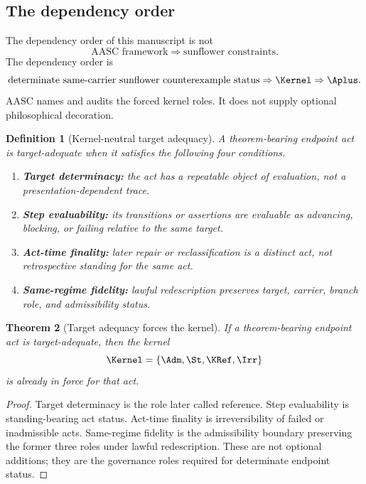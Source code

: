 \documentclass[11pt]{article}
\newtheorem{theorem}{Theorem}[section]
\newtheorem{definition}[theorem]{Definition}
\begin{document}
\subsection{The dependency order}

The dependency order of this manuscript is not
\[
  \text{AASC framework}\Rightarrow \text{sunflower constraints}.
\]
The dependency order is
\[
  \text{determinate same-carrier sunflower counterexample status}
  \Rightarrow \Kernel
  \Rightarrow \Aplus.
\]
AASC names and audits the forced kernel roles.  It does not supply optional philosophical decoration.

\begin{definition}[Kernel-neutral target adequacy]
A theorem-bearing endpoint act is target-adequate when it satisfies the following four conditions.
\begin{enumerate}[label=(A\arabic*)]
\item \textbf{Target determinacy:} the act has a repeatable object of evaluation, not a presentation-dependent trace.
\item \textbf{Step evaluability:} its transitions or assertions are evaluable as advancing, blocking, or failing relative to the same target.
\item \textbf{Act-time finality:} later repair or reclassification is a distinct act, not retrospective standing for the same act.
\item \textbf{Same-regime fidelity:} lawful redescription preserves target, carrier, branch role, and admissibility status.
\end{enumerate}
\end{definition}

\begin{theorem}[Target adequacy forces the kernel]\label{thm:adequacy-kernel}
If a theorem-bearing endpoint act is target-adequate, then the kernel
\[
  \Kernel=\{\Adm,\St,\KRef,\Irr\}
\]
is already in force for that act.
\end{theorem}

\begin{proof}
Target determinacy is the role later called reference.  Step evaluability is standing-bearing act status.  Act-time finality is irreversibility of failed or inadmissible acts.  Same-regime fidelity is the admissibility boundary preserving the former three roles under lawful redescription.  These are not optional additions; they are the governance roles required for determinate endpoint status.
\end{proof}
\end{document}
